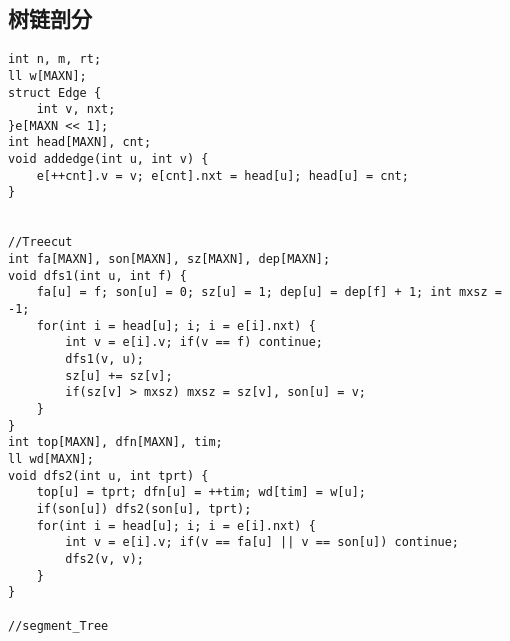 \documentclass{article}
\begin{document}
   \subsection{树链剖分}
   \begin{lstlisting}
int n, m, rt;
ll w[MAXN];
struct Edge {
	int v, nxt;
}e[MAXN << 1];
int head[MAXN], cnt;
void addedge(int u, int v) {
	e[++cnt].v = v; e[cnt].nxt = head[u]; head[u] = cnt;
}


//Treecut
int fa[MAXN], son[MAXN], sz[MAXN], dep[MAXN];
void dfs1(int u, int f) {
	fa[u] = f; son[u] = 0; sz[u] = 1; dep[u] = dep[f] + 1; int mxsz = -1;
	for(int i = head[u]; i; i = e[i].nxt) {
		int v = e[i].v; if(v == f) continue;
		dfs1(v, u);
		sz[u] += sz[v];
		if(sz[v] > mxsz) mxsz = sz[v], son[u] = v;
	}
}
int top[MAXN], dfn[MAXN], tim;
ll wd[MAXN];
void dfs2(int u, int tprt) {
	top[u] = tprt; dfn[u] = ++tim; wd[tim] = w[u];
	if(son[u]) dfs2(son[u], tprt);
	for(int i = head[u]; i; i = e[i].nxt) {
		int v = e[i].v; if(v == fa[u] || v == son[u]) continue;
		dfs2(v, v);
	}
}

//segment_Tree


\end{lstlisting}
\end{document}
